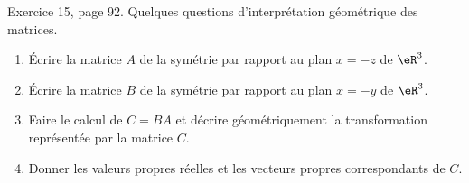 \begin{exercice}\label{exoLineraire0038}

	Exercice 15, page 92. Quelques questions d'interprétation géométrique des matrices.
	\begin{enumerate}

		\item
			Écrire la matrice $A$ de la symétrie par rapport au plan $x=-z$ de $\eR^3$.

		\item
			Écrire la matrice $B$ de la symétrie par rapport au plan $x=-y$ de $\eR^3$.

		\item
			Faire le calcul de $C=BA$ et décrire géométriquement la transformation représentée par la matrice $C$.

		\item
			Donner les valeurs propres réelles et les vecteurs propres correspondants de $C$.
	\end{enumerate}
	

\end{exercice}
